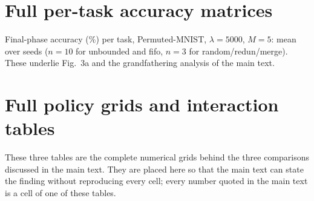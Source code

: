 \documentclass[11pt]{article}
\begin{document}
\section{Full per-task accuracy matrices}
\label{appx:matrices}

\begin{sloppypar}
Final-phase accuracy (\%) per task, Permuted-MNIST, $\lambda{=}5000$,
$M{=}5$: mean over seeds ($n{=}10$ for unbounded and fifo, $n{=}3$ for
random/redun/merge). These underlie Fig.~3a and the grandfathering
analysis of the main text.
\end{sloppypar}

\begin{table}[h]
\centering\small
\caption{$T{=}10$.}
\label{tab:appx-t10}

\end{table}

\begin{table}[h]
\centering\small
\caption{$T{=}20$.}
\label{tab:appx-t20}

\end{table}


\section{Full policy grids and interaction tables}
\label{appx:tables}

These three tables are the complete numerical grids behind the three
comparisons discussed in the main text. They are placed here so that the
main text can state the finding without reproducing every cell; every
number quoted in the main text is a cell of one of these tables.
\end{document}
